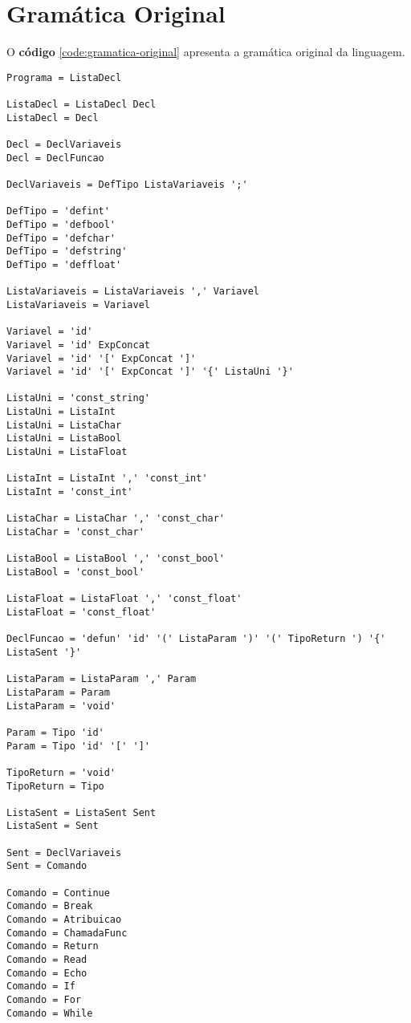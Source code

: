 \documentclass[
  12pt,				%
  oneside,			%
  a4paper,			%
  english,			%
  french,				%
  spanish,			%
  brazil,				%
]{abntex2}
\begin{document}
\chapter{Gramática Original}
\label{cha:gramatica-original}
O \textbf{código} \ref{code:gramatica-original} apresenta a gramática
original da linguagem.

\begin{lstlisting}[label={code:gramatica-original},caption={Gramática
    original da linguagem de programação LisC.},style={mystyle}]
Programa = ListaDecl

ListaDecl = ListaDecl Decl
ListaDecl = Decl

Decl = DeclVariaveis
Decl = DeclFuncao

DeclVariaveis = DefTipo ListaVariaveis ';'

DefTipo = 'defint'
DefTipo = 'defbool'
DefTipo = 'defchar'
DefTipo = 'defstring'
DefTipo = 'deffloat'

ListaVariaveis = ListaVariaveis ',' Variavel
ListaVariaveis = Variavel

Variavel = 'id'
Variavel = 'id' ExpConcat
Variavel = 'id' '[' ExpConcat ']'
Variavel = 'id' '[' ExpConcat ']' '{' ListaUni '}'

ListaUni = 'const_string'
ListaUni = ListaInt
ListaUni = ListaChar
ListaUni = ListaBool
ListaUni = ListaFloat

ListaInt = ListaInt ',' 'const_int'
ListaInt = 'const_int'

ListaChar = ListaChar ',' 'const_char'
ListaChar = 'const_char'

ListaBool = ListaBool ',' 'const_bool'
ListaBool = 'const_bool'

ListaFloat = ListaFloat ',' 'const_float'
ListaFloat = 'const_float'

DeclFuncao = 'defun' 'id' '(' ListaParam ')' '(' TipoReturn ') '{' ListaSent '}'

ListaParam = ListaParam ',' Param
ListaParam = Param
ListaParam = 'void'

Param = Tipo 'id'
Param = Tipo 'id' '[' ']'

TipoReturn = 'void'
TipoReturn = Tipo

ListaSent = ListaSent Sent
ListaSent = Sent

Sent = DeclVariaveis
Sent = Comando

Comando = Continue
Comando = Break
Comando = Atribuicao
Comando = ChamadaFunc
Comando = Return
Comando = Read
Comando = Echo
Comando = If
Comando = For
Comando = While


\end{lstlisting}
\end{document}
